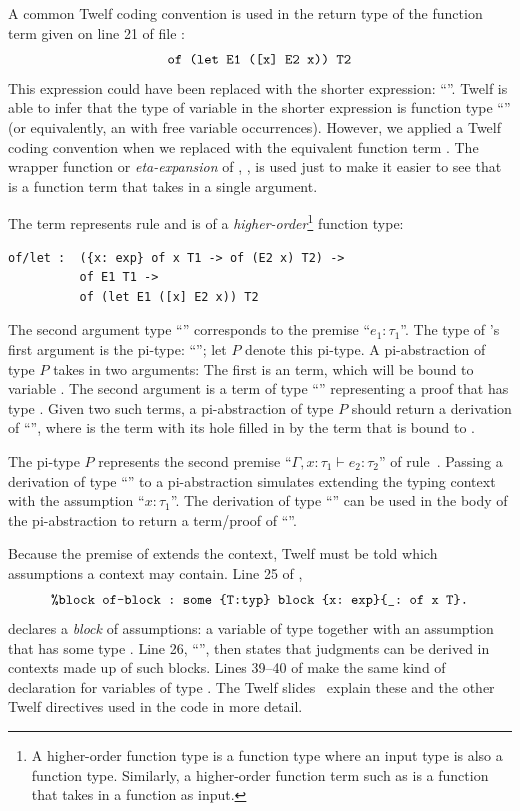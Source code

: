 A common Twelf coding convention is used in
the return type of the  function term
given on line 21 of file :
\[ \texttt{of (let E1 ([x] E2 x)) T2} \]
This expression could have been replaced with
the shorter expression:
``\mbox{}''.
Twelf is able to infer that the type of variable 
in the shorter expression is
function type ``\mbox{}''
(or equivalently, an  with free variable
occurrences).
However, we applied a Twelf coding convention when
we replaced  with the equivalent function
term .
The wrapper function or \emph{eta-expansion}
of , , is used 
just to make it easier to see that  is
a function term that takes in a single argument.

The  term represents rule 
and is of a \emph{higher-order}\footnote{A higher-order function type is a function
type where an input type is also
a function type.
Similarly, a higher-order function term such as
 is a
function that takes in a function as input.}
function type:
\begin{verbatim}
of/let :  ({x: exp} of x T1 -> of (E2 x) T2) ->
          of E1 T1 ->
          of (let E1 ([x] E2 x)) T2
\end{verbatim}
The second argument type ``\mbox{}''
corresponds to the premise ``$e_1 : \tau_1$''.
The type of 's first argument is the pi-type:
``\mbox{}'';
let $P$ denote this pi-type.
A pi-abstraction of type $P$ takes in two arguments:
The first is an  term, which will be bound
to variable .
The second argument is a term of type ``\mbox{}''
representing a proof that  has type .
Given two such terms,
a pi-abstraction of type $P$ should return
a derivation of ``\mbox{}'',
where  is the  term with its hole
filled in by the  term that is bound to .

The pi-type $P$ represents the second premise
``\mbox{$\Gamma , x : \tau_1 \vdash e_2 : \tau_2$}''
of rule~.
Passing a derivation  of type ``\mbox{}''
to a pi-abstraction simulates extending the typing context
with the assumption ``\mbox{$x : \tau_1$}''.
The derivation  of type ``\mbox{}''
can be used in the body of the pi-abstraction to
return a term/proof of ``\mbox{}''.

Because the premise of  extends the context,
Twelf must be told which assumptions a context may contain.
Line 25 of ,
\[ \texttt{\%block of-block :\ some \{T:typ\} block \{x:\ exp\}\{\_:\ of x T\}.} \]
declares a \emph{block} of assumptions:
a variable  of type 
together with an assumption that  has some type .
Line 26, ``\mbox{}'',
then states that  judgments can be derived in contexts
made up of such blocks.
Lines 39--40 of  make the same kind of declaration
for variables of type .
The Twelf slides~\cite{twelf-slides} explain these and the other
Twelf directives used in the code in more detail.

